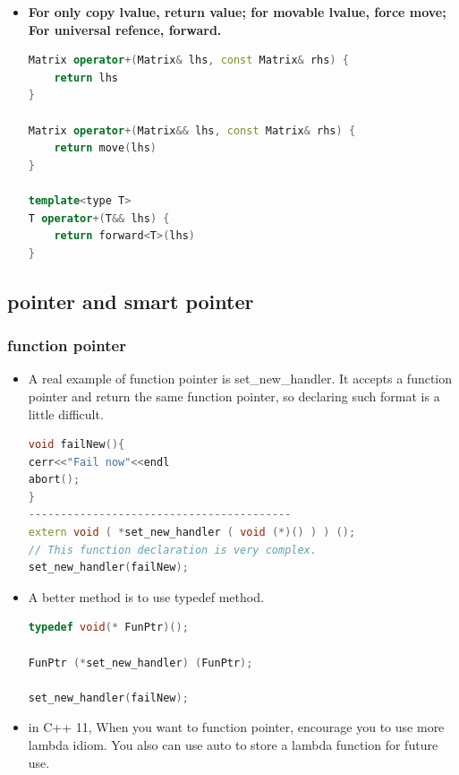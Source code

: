 \documentclass[a4paper,12pt,twoside]{book}
\begin{document}
\begin{itemize}
\item \textbf{For only copy lvalue, return value; for movable lvalue, force move;  For universal refence, forward. }
\begin{lstlisting}[frame=single, language=c++]
Matrix operator+(Matrix& lhs, const Matrix& rhs) {
    return lhs
}

Matrix operator+(Matrix&& lhs, const Matrix& rhs) {
    return move(lhs)
}

template<type T>
T operator+(T&& lhs) {
    return forward<T>(lhs)
}
\end{lstlisting}

\end{itemize}


\subsection{pointer and smart pointer}

\subsubsection{function pointer}
\begin{itemize}

\item A real example of function pointer is set\_new\_handler. It accepts a function pointer and return the same function pointer, so declaring such format is a little difficult.
\begin{lstlisting}[frame=single, language=c++]
void failNew(){
cerr<<"Fail now"<<endl
abort();
}
-----------------------------------------
extern void ( *set_new_handler ( void (*)() ) ) ();
// This function declaration is very complex.
set_new_handler(failNew);
\end{lstlisting}

\item A better method is to use typedef method.
\begin{lstlisting}[frame=single, language=c++]
typedef void(* FunPtr)();

FunPtr (*set_new_handler) (FunPtr);

set_new_handler(failNew);
\end{lstlisting}

\item in C++ 11, When you want to function pointer, encourage you to use more lambda idiom. You also can use auto to store a lambda function for future use.
\end{itemize}
\end{document}
